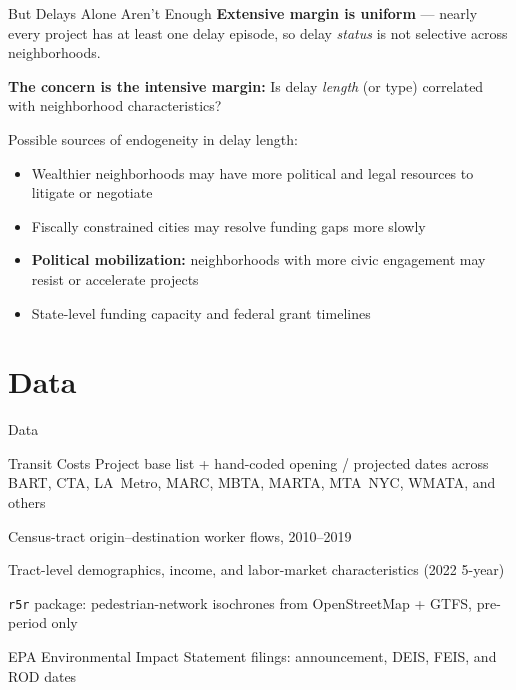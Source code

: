 \documentclass{beamer}
\begin{document}
\begin{frame}{But Delays Alone Aren't Enough}
\small
\textbf{Extensive margin is uniform} --- nearly every project has at least one
delay episode, so delay \emph{status} is not selective across neighborhoods.

\bigskip
\textbf{The concern is the intensive margin:} Is delay \emph{length} (or type)
correlated with neighborhood characteristics?

\bigskip
Possible sources of endogeneity in delay length:
\begin{itemize}
  \item Wealthier neighborhoods may have more political and legal resources
        to litigate or negotiate
  \item Fiscally constrained cities may resolve funding gaps more slowly
  \item \textbf{Political mobilization:} neighborhoods with more civic engagement
        may resist or accelerate projects
  \item State-level funding capacity and federal grant timelines
\end{itemize}

\end{frame}

\section{Data}

\begin{frame}{Data}
\small
\begin{description}[labelwidth=3.2cm,leftmargin=!]
  \item[Station dataset]
    Transit Costs Project base list + hand-coded opening / projected dates
    across BART, CTA, LA~Metro, MARC, MBTA, MARTA, MTA~NYC, WMATA, and others
  \item[LODES]
    Census-tract origin--destination worker flows, 2010--2019
  \item[ACS]
    Tract-level demographics, income, and labor-market characteristics
    (2022 5-year)
  \item[Walking times]
    \texttt{r5r} package: pedestrian-network isochrones from
    OpenStreetMap + GTFS, pre-period only \parencite{r5r}
  \item[EIS records]
    EPA Environmental Impact Statement filings: announcement, DEIS, FEIS,
    and ROD dates
\end{description}
\end{frame}
\end{document}
